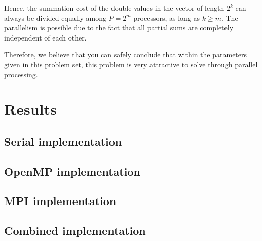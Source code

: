 \documentclass[fontsize=11pt,paper=a4,titlepage]{report}
\begin{document}
Hence, the summation cost of the double-values in the vector of length $2^k$ can
always be divided equally among $P = 2^m$ processors, as long as $k\geq m$. The
parallelism is possible due to the fact that all partial sums are completely
independent of each other.

Therefore, we believe that you can safely conclude that within the parameters
given in this problem set, this problem is very attractive to solve through
parallel processing.

\section{Results}


\subsection{Serial implementation}

\subsection{OpenMP implementation}

\subsection{MPI implementation}

\subsection{Combined implementation}
\end{document}
